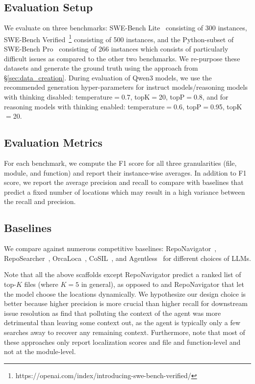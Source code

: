\subsection{Evaluation Setup}\label{sec:eval_benchmarks}
We evaluate \methodname on three benchmarks: SWE-Bench Lite~\citep{jimenez2024swebenchlanguagemodelsresolve} consisting of 300 instances, SWE-Bench Verified~\footnote{https://openai.com/index/introducing-swe-bench-verified/} consisting of 500 instances, and the Python-subset of SWE-Bench Pro~\citep{deng2025swebenchproaiagents} consisting of 266 instances which consists of particularly difficult issues as compared to the other two benchmarks. We re-purpose these datasets and generate the ground truth using the approach from \S\ref{sec:data_creation}. During evaluation of Qwen3 models, we use the recommended generation hyper-parameters for instruct models/reasoning models with thinking disabled: temperature$=$0.7, topK$=$20, topP$=$0.8, and for reasoning models with thinking enabled: temperature$=$0.6, topP$=$0.95, topK$=$20.

\subsection{Evaluation Metrics}\label{sec:eval_metrics}
For each benchmark, we compute the F1 score for all three granularities (file, module, and function) and report their instance-wise averages. In addition to F1 score, we report the average precision and recall to compare with baselines that predict a fixed number of locations which may result in a high variance between the recall and precision.

\subsection{Baselines}\label{sec:baselines}
We compare \methodname against numerous competitive baselines: RepoNavigator~\citep{zhang2026toolenoughreinforcementlearning}, RepoSearcher~\citep{ma2025toolintegratedreinforcementlearningrepo}, OrcaLoca~\citep{yu2025orcalocallmagentframework}, CoSIL~\citep{liu2025cosil}, and Agentless~\citep{xia2024agentlessdemystifyingllmbasedsoftware} for different choices of LLMs. 

Note that all the above scaffolds except 
RepoNavigator predict a ranked list of top-$K$ files (where $K=5$ in general), as opposed to \methodname and RepoNavigator that let the model choose the locations dynamically. We hypothesize our design choice is better because higher precision is more crucial than higher recall for downstream issue resolution as \citet{cognition2025swegrep} find that polluting the context of the agent was more detrimental than leaving some context out, as the agent is typically only a few searches away to recover any remaining context. Furthermore, note that most of these approaches only report localization scores and file and function-level and not at the module-level.


